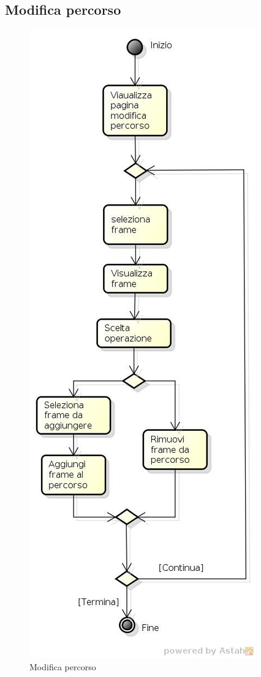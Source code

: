 \subsection{Modifica percorso}

\begin{figure}[h!]
		\centering
		\includegraphics[scale=.2]{img/Modifica_percorso.jpg}
		\caption{Modifica percorso}
		\label{fig:ModelloSpy}
\end{figure}

